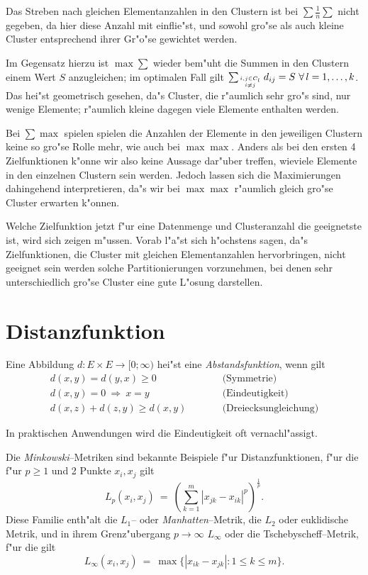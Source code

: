 Das Streben nach gleichen Elementanzahlen in den Clustern ist bei 
$\sum\frac 1n \sum$ nicht gegeben, da hier diese Anzahl mit einflie"st, 
und sowohl gro"se als auch kleine Cluster entsprechend ihrer
Gr"o"se gewichtet werden.

Im Gegensatz hierzu ist $\max\sum$ wieder bem"uht die Summen in den Clustern
einem Wert $S$ anzugleichen; im optimalen Fall gilt 
$\sum_{i,j \in C_l \atop i\neq j } d_{ij} = S \ \forall\, l = 1,\dots,k$.
Das hei"st geometrisch gesehen, da"s Cluster, die r"aumlich sehr gro"s
sind, nur wenige Elemente; r"aumlich kleine dagegen viele Elemente
enthalten werden.

Bei $\sum\max$ spielen spielen die Anzahlen der Elemente in den jeweiligen
Clustern keine so gro"se Rolle mehr, wie auch bei $\max\max$. 
Anders als bei den ersten 4 Zielfunktionen k"onne wir also keine
Aussage dar"uber treffen, wieviele Elemente in den einzelnen Clustern
sein werden.
Jedoch lassen sich die Maximierungen dahingehend interpretieren, 
da"s wir bei $\max\max$ r"aumlich  gleich gro"se Cluster erwarten k"onnen.

Welche Zielfunktion jetzt f"ur eine Datenmenge und Clusteranzahl die
geeignetste ist, wird sich zeigen m"ussen. 
Vorab l"a"st sich h"ochstens sagen, da"s Zielfunktionen, 
die Cluster mit gleichen Elementanzahlen hervorbringen, 
nicht geeignet sein werden solche Partitionierungen vorzunehmen, 
bei denen sehr unterschiedlich gro"se Cluster eine gute 
L"osung darstellen.

\section{Distanzfunktion}
\label{distanzfunktion}
\begin{definition}
Eine Abbildung $d:E\times E \to [0;\infty)$ hei"st eine 
{\em Abstandsfunktion}, wenn gilt
\begin{eqnarray*}
	d(x,y)  =  d(y,x)  \geq  0 & \qquad & \mbox{(Symmetrie)}\\
	d(x,y) = 0 \ \Rightarrow  \ x = y &       & \mbox{(Eindeutigkeit)}\\
	d(x,z) + d(z,y)  \geq  d(x,y) &       & \mbox{(Dreiecksungleichung)}
\end{eqnarray*}
\end{definition}
In praktischen Anwendungen wird die Eindeutigkeit oft vernachl"assigt.

Die {\em Minkowski}--Metriken sind bekannte Beispiele f"ur 
Distanzfunktionen, f"ur die f"ur $p \geq 1$ und 2 Punkte $x_i,x_j$ gilt
\[ L_p (x_i,x_j) \ = \ \left(\sum_{k=1}^m |x_{jk} - x_{ik} |^p
	\right) ^{\frac 1 p}. \]
Diese Familie enth"alt die $L_1$-- oder {\em Manhatten}--Metrik, die
$L_2$ oder euklidische Metrik, und in ihrem Grenz"ubergang
$p \to \infty$ $L_\infty$ oder die Tschebyscheff--Metrik, f"ur die gilt
\[ L_\infty(x_i,x_j) \ = \ \max \{ | x_{ik} - x_{jk} | : 1 \leq k \leq m \}.\]

